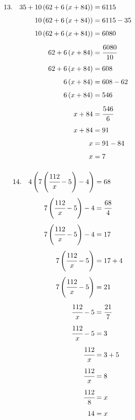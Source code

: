 \documentclass{article}
\begin{document}
\noindent
\begin{minipage}[t]{0.5000\textwidth}
\begin{align*}
13.\hspace{10pt}35+10\left(62+6\left(x+84\right)\right)&=6115\\[4pt]
10\left(62+6\left(x+84\right)\right)&=6115-35\\[4pt]
10\left(62+6\left(x+84\right)\right)&=6080\\[4pt]
62+6\left(x+84\right)&=\cfrac{6080}{10}\\[4pt]
62+6\left(x+84\right)&=608\\[4pt]
6\left(x+84\right)&=608-62\\[4pt]
6\left(x+84\right)&=546\\[4pt]
x+84&=\cfrac{546}{6}\\[4pt]
x+84&=91\\[4pt]
x&=91-84\\[4pt]
x&=7\\[4pt]
\end{align*}
\end{minipage}
\begin{minipage}[t]{0.5000\textwidth}
\begin{align*}
14.\hspace{10pt}4\left(7\left(\cfrac{112}{x}-5\right)-4\right)&=68\\[4pt]
7\left(\cfrac{112}{x}-5\right)-4&=\cfrac{68}{4}\\[4pt]
7\left(\cfrac{112}{x}-5\right)-4&=17\\[4pt]
7\left(\cfrac{112}{x}-5\right)&=17+4\\[4pt]
7\left(\cfrac{112}{x}-5\right)&=21\\[4pt]
\cfrac{112}{x}-5&=\cfrac{21}{7}\\[4pt]
\cfrac{112}{x}-5&=3\\[4pt]
\cfrac{112}{x}&=3+5\\[4pt]
\cfrac{112}{x}&=8\\[4pt]
\cfrac{112}{8}&=x\\[4pt]
14&=x\\[4pt]
\end{align*}
\end{minipage}
\vspace{10 mm}
\end{document}
